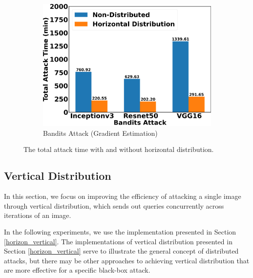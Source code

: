 \begin{figure}[tbp]
\begin{subfigure}[b]{0.6\textwidth}
    \centering
    \includegraphics[width=\textwidth]{figures/chapter_classification/bandits_attack_horizontal_time.png}
    \caption{Bandits Attack (Gradient Estimation)}
    \label{fig:bandits_horizon}
\end{subfigure}
\caption{The total attack time with and without horizontal distribution.}
\label{fig.horizon_time}
\end{figure}

\clearpage

\subsection{Vertical Distribution}

In this section, we focus on improving the efficiency of attacking a single image through vertical distribution, which sends out queries concurrently across iterations of an image. 

In the following experiments, we use the implementation presented in Section \ref{horizon_vertical}. The implementations of vertical distribution presented in Section \ref{horizon_vertical} serve to illustrate the general concept of distributed attacks, but there may be other approaches to achieving vertical distribution that are more effective for a specific black-box attack.



